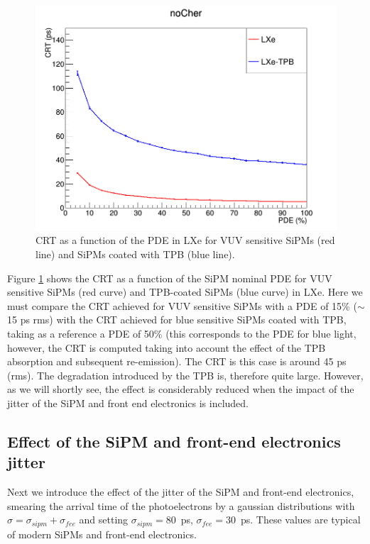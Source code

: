 \documentclass[review]{elsarticle}
\begin{document}
\begin{figure}[!bhtp]
	\centering
	\includegraphics[scale=0.5]{../img/CRTvsPDELXeTPBNoJitter.png}
	\caption{\label{fig.crt2} CRT as a function of the PDE in LXe for VUV sensitive SiPMs (red line) and SiPMs coated with TPB (blue line). }
\end{figure}

Figure \ref{fig.crt2} shows the CRT as a function of the
 SiPM nominal PDE for VUV sensitive SiPMs (red curve) and TPB-coated SiPMs (blue curve) in LXe. Here we must compare the CRT achieved for VUV sensitive SiPMs with a PDE of 15\% ($\sim$ 15 ps rms) with the CRT achieved for blue sensitive SiPMs coated with TPB, taking as a reference a PDE of 50\% (this corresponds to the
 PDE for blue light,  however, the CRT is computed taking into account the effect of the TPB absorption and subsequent re-emission).  The CRT is this case is around 45 ps (rms). The degradation introduced by the TPB is, therefore quite large. However, as we will shortly see, the effect is
 considerably reduced when the impact of the jitter of the SiPM and front end electronics is included. 
  
\subsection*{Effect of the SiPM  and front-end electronics jitter}
  Next we introduce the effect of the jitter of the SiPM and front-end electronics, smearing the arrival time of the photoelectrons by a gaussian distributions with $\sigma = \sigma_{sipm} +  \sigma_{fee}$ and setting 
 $\sigma_{sipm} = 80$~ps, $\sigma_{fee} = 30$~ps. These values are typical of modern SiPMs and front-end electronics. 
 
\end{document}
